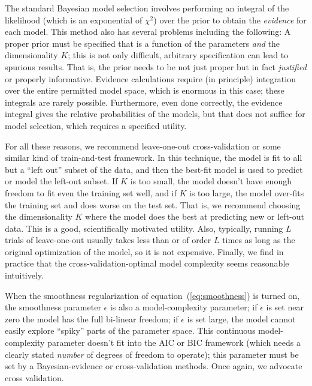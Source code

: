 \documentclass[12pt,preprint]{aastex}
\newcommand{\equationname}{equation}
\begin{document}
The standard Bayesian model selection involves performing an integral
of the likelihood (which is an exponential of $\chi^2$) over the prior
to obtain the \emph{evidence} for each model.  This method also has
several problems including the following: A proper prior must be
specified that is a function of the parameters \emph{and} the
dimensionality $K$; this is not only difficult, arbitrary
specification can lead to spurious results.  That is, the prior needs
to be not just proper but in fact \emph{justified} or properly
informative.  Evidence calculations require (in principle) integration
over the entire permitted model space, which is enormous in this case;
these integrals are rarely possible.  Furthermore, even done
correctly, the evidence integral gives the relative probabilities of
the models, but that does not suffice for model selection, which
requires a specified utility.

For all these reasons, we recommend leave-one-out cross-validation or
some similar kind of train-and-test framework.  In this technique, the
model is fit to all but a ``left out'' subset of the data, and then
the best-fit model is used to predict or model the left-out subset.
If $K$ is too small, the model doesn't have enough freedom to fit even
the training set well, and if $K$ is too large, the model over-fits
the training set and does worse on the test set.  That is, we
recommend choosing the dimensionality $K$ where the model does the
best at predicting new or left-out data.  This is a good,
scientifically motivated utility.  Also, typically, running $L$ trials
of leave-one-out usually takes less than or of order $L$ times as long
as the original optimization of the model, so it is not expensive.
Finally, we find in practice that the cross-validation-optimal model
complexity seems reasonable intuitively.

When the smoothness regularization of
\equationname~(\ref{eq:smoothness}) is turned on, the smoothness
parameter $\epsilon$ is also a model-complexity parameter; if
$\epsilon$ is set near zero the model has the full bi-linear freedom;
if $\epsilon$ is set large, the model cannot easily explore ``spiky''
parts of the parameter space.  This continuous model-complexity
parameter doesn't fit into the AIC or BIC framework (which needs a
clearly stated \emph{number} of degrees of freedom to operate); this
parameter must be set by a Bayesian-evidence or cross-validation
methods.  Once again, we advocate cross validation.
\end{document}
